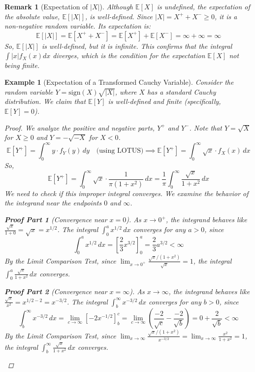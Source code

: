\documentclass[11pt]{article}
\newtheorem{example}{Example}[section]       %
\newtheorem{remark}{Remark}[section]         %
\theoremstyle{definition} %
\newtheorem*{proofpart}{Proof Part}           %
\newcommand{\E}{\mathbb{E}}     %
\begin{document}
\begin{remark}[Expectation of $|X|$]
Although $\E[X]$ is undefined, the expectation of the absolute value, $\E[|X|]$, is well-defined. Since $|X| = X^+ + X^- \ge 0$, it is a non-negative random variable. Its expectation is:
\[
\E[|X|] = \E[X^+ + X^-] = \E[X^+] + \E[X^-] = \infty + \infty = \infty
\]
So, $\E[|X|]$ is well-defined, but it is infinite. This confirms that the integral $\int |x| f_X(x) dx$ diverges, which is the condition for the expectation $\E[X]$ not being finite.
\end{remark}

\begin{example}[Expectation of a Transformed Cauchy Variable]
\label{ex:transformed_cauchy}
Consider the random variable $Y = \text{sign}(X) \sqrt{|X|}$, where $X$ has a standard Cauchy distribution. We claim that $\E[Y]$ is well-defined and finite (specifically, $\E[Y]=0$).

\begin{proof}
We analyze the positive and negative parts, $Y^+$ and $Y^-$. Note that $Y = \sqrt{X}$ for $X \ge 0$ and $Y = -\sqrt{-X}$ for $X < 0$.
\[
\E[Y^+] = \int_{0}^{\infty} y \cdot f_Y(y) \, dy \quad \text{(using LOTUS)} \implies \E[Y^+] = \int_{0}^{\infty} \sqrt{x} \cdot f_X(x) \, dx
\]
So,
\[
\E[Y^+] = \int_{0}^{\infty} \sqrt{x} \cdot \frac{1}{\pi(1 + x^2)} \, dx = \frac{1}{\pi} \int_{0}^{\infty} \frac{\sqrt{x}}{1 + x^2} \, dx
\]
We need to check if this improper integral converges. We examine the behavior of the integrand near the endpoints $0$ and $\infty$.

\begin{proofpart}[Convergence near $x=0$]
As $x \to 0^+$, the integrand behaves like $\frac{\sqrt{x}}{1+0} = \sqrt{x} = x^{1/2}$.
The integral $\int_{0}^{a} x^{1/2} \, dx$ converges for any $a > 0$, since
\[ \int_{0}^{a} x^{1/2} \, dx = \left[ \frac{2}{3} x^{3/2} \right]_{0}^{a} = \frac{2}{3} a^{3/2} < \infty \]
By the Limit Comparison Test, since $\lim_{x \to 0^+} \frac{\sqrt{x}/(1+x^2)}{\sqrt{x}} = 1$, the integral $\int_{0}^{a} \frac{\sqrt{x}}{1 + x^2} \, dx$ converges.
\end{proofpart}

\begin{proofpart}[Convergence near $x=\infty$]
As $x \to \infty$, the integrand behaves like $\frac{\sqrt{x}}{x^2} = x^{1/2 - 2} = x^{-3/2}$.
The integral $\int_{b}^{\infty} x^{-3/2} \, dx$ converges for any $b > 0$, since
\[ \int_{b}^{\infty} x^{-3/2} \, dx = \lim_{c \to \infty} \left[ -2 x^{-1/2} \right]_{b}^{c} = \lim_{c \to \infty} \left( \frac{-2}{\sqrt{c}} - \frac{-2}{\sqrt{b}} \right) = 0 + \frac{2}{\sqrt{b}} < \infty \]
By the Limit Comparison Test, since $\lim_{x \to \infty} \frac{\sqrt{x}/(1+x^2)}{x^{-3/2}} = \lim_{x \to \infty} \frac{x^2}{1+x^2} = 1$, the integral $\int_{b}^{\infty} \frac{\sqrt{x}}{1 + x^2} \, dx$ converges.
\end{proofpart}


\end{proof}
\end{example}
\end{document}
